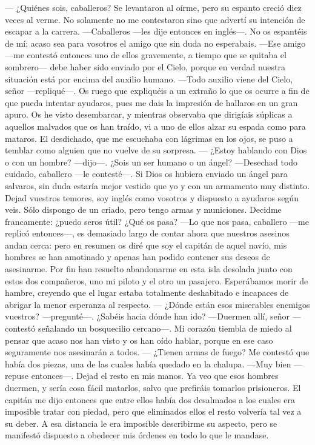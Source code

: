 \documentclass{novela}
\begin{document}
    — ¿Quiénes sois, caballeros?
    Se levantaron al oírme, pero su espanto creció diez veces al verme. No solamente no me contestaron sino que advertí su intención de escapar a la carrera.
    —Caballeros —les dije entonces en inglés—. No os espantéis de mí; acaso sea para vosotros el amigo que sin duda no esperabais.
    —Ese amigo —me contestó entonces uno de ellos gravemente, a tiempo que se quitaba el sombrero— debe haber sido enviado por el Cielo, porque en verdad nuestra situación está por encima del auxilio humano.
    —Todo auxilio viene del Cielo, señor —repliqué—. Os ruego que expliquéis a un extraño lo que os ocurre a fin de que pueda intentar ayudaros, pues me dais la impresión de hallaros en un gran apuro. Os he visto desembarcar, y mientras observaba que dirigíais súplicas a aquellos malvados que os han traído, vi a uno de ellos alzar su espada como para mataros.
    El desdichado, que me escuchaba con lágrimas en los ojos, se puso a temblar como alguien que no vuelve de su sorpresa.
    — ¿Estoy hablando con Dios o con un hombre? —dijo—. ¿Sois un ser humano o un ángel?
    —Desechad todo cuidado, caballero —le contesté—. Si Dios os hubiera enviado un ángel para salvaros, sin duda estaría mejor vestido que yo y con un armamento muy distinto. Dejad vuestros temores, soy inglés como vosotros y dispuesto a ayudaros según veis. Sólo dispongo de un criado, pero tengo armas y municiones. Decidme francamente: ¿puedo seros útil? ¿Qué os pasa?
    —Lo que nos pasa, caballero —me replicó entonces—, es demasiado largo de contar ahora que nuestros asesinos andan cerca: pero en resumen os diré que soy el capitán de aquel navío, mis hombres se han amotinado y apenas han podido contener sus deseos de asesinarme. Por fin han resuelto abandonarme en esta isla desolada junto con estos dos compañeros, uno mi piloto y el otro un pasajero. Esperábamos morir de hambre, creyendo que el lugar estaba totalmente deshabitado e incapaces de abrigar la menor esperanza al respecto.
    — ¿Dónde están esos miserables enemigos vuestros? —pregunté—. ¿Sabéis hacia dónde han ido?
    —Duermen allí, señor —contestó señalando un bosquecilio cercano—. Mi corazón tiembla de miedo al pensar que acaso nos han visto y os han oído hablar, porque en ese caso seguramente nos asesinarán a todos. — ¿Tienen armas de fuego?
    Me contestó que había dos piezas, una de las cuales había quedado en la chalupa.
    —Muy bien —repuse entonces—. Dejad el resto en mis manos. Ya veo que esos hombres duermen, y sería cosa fácil matarlos, salvo que prefiráis tomarlos prisioneros.
    El capitán me dijo entonces que entre ellos había dos desalmados a los cuales era imposible tratar con piedad, pero que eliminados ellos el resto volvería tal vez a su deber. A esa distancia le era imposible describirme su aspecto, pero se manifestó dispuesto a obedecer mis órdenes en todo lo que le mandase.
\end{document}
